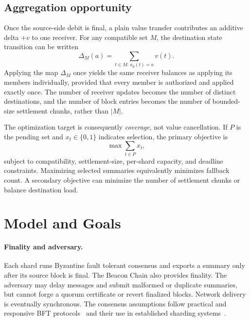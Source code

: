 \documentclass[sigconf,anonymous,review]{acmart}
\begin{document}
\subsection{Aggregation opportunity}

Once the source-side debit is final, a plain value transfer contributes an additive delta $+v$ to one receiver. For any compatible set $M$, the destination state transition can be written
\begin{equation}
  \Delta_M(a)=\sum_{t\in M:\,a_d(t)=a} v(t).
  \label{eq:aggregate}
\end{equation}
Applying the map $\Delta_M$ once yields the same receiver balances as applying its members individually, provided that every member is authorized and applied exactly once. The number of receiver updates becomes the number of distinct destinations, and the number of block entries becomes the number of bounded-size settlement chunks, rather than $|M|$.

The optimization target is consequently \emph{coverage}, not value cancellation. If $P$ is the pending set and $x_t\in\{0,1\}$ indicates selection, the primary objective is
\begin{equation}
  \max \sum_{t\in P}x_t,
  \label{eq:coverage}
\end{equation}
subject to compatibility, settlement-size, per-shard capacity, and deadline constraints. Maximizing selected summaries equivalently minimizes fallback count. A secondary objective can minimize the number of settlement chunks or balance destination load.

\section{Model and Goals}

\paragraph{Finality and adversary.}
Each shard runs Byzantine fault tolerant consensus and exports a summary only after its source block is final. The Beacon Chain also provides finality. The adversary may delay messages and submit malformed or duplicate summaries, but cannot forge a quorum certificate or revert finalized blocks. Network delivery is eventually synchronous. The consensus assumptions follow practical and responsive BFT protocols~\cite{pbft1999,byzcoin2016,hotstuff2019} and their use in established sharding systems~\cite{omniledger2018,rapidchain2018,chainspace2018}.
\end{document}
